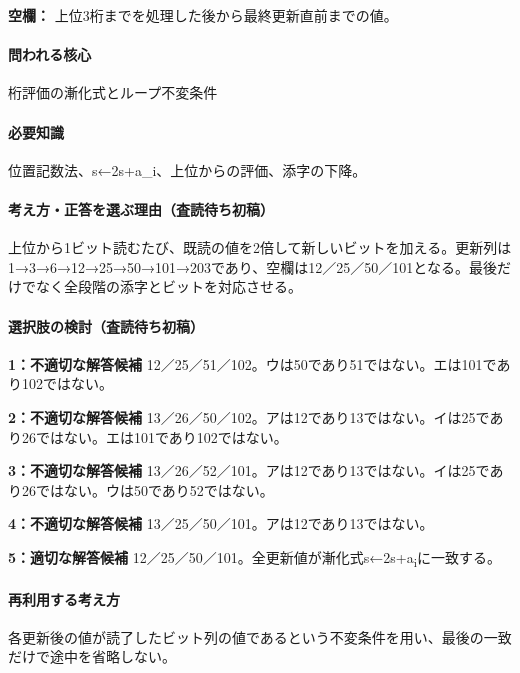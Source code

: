 \noindent\textbf{空欄：} 上位3桁までを処理した後から最終更新直前までの値。\par

\paragraph{問われる核心} 桁評価の漸化式とループ不変条件

\paragraph{必要知識} 位置記数法、s←2s+a\_i、上位からの評価、添字の下降。

\paragraph{考え方・正答を選ぶ理由（査読待ち初稿）} 上位から1ビット読むたび、既読の値を2倍して新しいビットを加える。更新列は1→3→6→12→25→50→101→203であり、空欄は12／25／50／101となる。最後だけでなく全段階の添字とビットを対応させる。

\paragraph{選択肢の検討（査読待ち初稿）}\mbox{}\par

\noindent\textbf{1：不適切な解答候補} 12／25／51／102。ウは50であり51ではない。エは101であり102ではない。\par

\noindent\textbf{2：不適切な解答候補} 13／26／50／102。アは12であり13ではない。イは25であり26ではない。エは101であり102ではない。\par

\noindent\textbf{3：不適切な解答候補} 13／26／52／101。アは12であり13ではない。イは25であり26ではない。ウは50であり52ではない。\par

\noindent\textbf{4：不適切な解答候補} 13／25／50／101。アは12であり13ではない。\par

\noindent\textbf{5：適切な解答候補} 12／25／50／101。全更新値が漸化式s←2s+a\textsubscript{i}に一致する。\par

\paragraph{再利用する考え方} 各更新後の値が読了したビット列の値であるという不変条件を用い、最後の一致だけで途中を省略しない。

